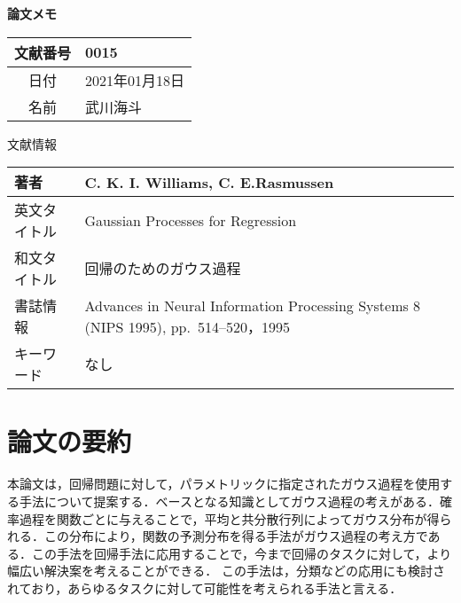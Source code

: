 \documentclass[10pt,onecolumn]{jsarticle}
\begin{document}
\vspace{-20mm}
\begin{center}
{\LARGE\textbf{論文メモ}}
\end{center}

\begin{flushright}
\begin{tabular}{|c|l|}
\hline
文献番号  &  0015
\\
\hline
日付  &  2021年01月18日
\\
\hline
名前  &  武川海斗
\\
\hline
\end{tabular}
\end{flushright}


%
%
\begin{center}
{\large 文献情報}
\begin{table}[hbp]%
\begin{tabular}{|l||l|}
\hline
著者  & C. K. I. Williams, C. E.Rasmussen
\\ \hline
英文タイトル  & Gaussian Processes for Regression
\\ \hline
和文タイトル  & 回帰のためのガウス過程
\\ \hline
書誌情報  &  Advances in Neural Information Processing Systems 8 (NIPS 1995), pp.~514--520，1995
\\ \hline
キーワード & なし
\\ \hline
\end{tabular}
\end{table}
\end{center}


\section{論文の要約}
本論文は，回帰問題に対して，パラメトリックに指定されたガウス過程を使用する手法について提案する．ベースとなる知識としてガウス過程の考えがある．確率過程を関数ごとに与えることで，平均と共分散行列によってガウス分布が得られる．この分布により，関数の予測分布を得る手法がガウス過程の考え方である．この手法を回帰手法に応用することで，今まで回帰のタスクに対して，より幅広い解決案を考えることができる．
この手法は，分類などの応用にも検討されており，あらゆるタスクに対して可能性を考えられる手法と言える．
\end{document}
